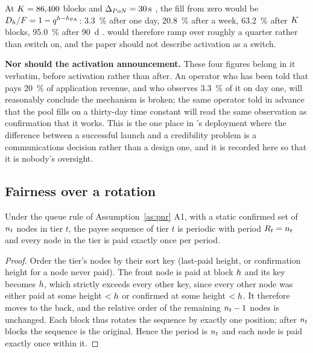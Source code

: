 At $K = 86{,}400$ blocks and $\Delta_{PoN} = \SI{30}{\second}$
, the fill from zero would be
$D_{h}/F = 1 - q^{h - h_{\mathrm{PA}}}$: \SI{3.3}{\percent} after one day, \SI{20.8}{\percent} after a
week, \SI{63.2}{\percent} after $K$ blocks, \SI{95.0}{\percent} after \SI{90}{\day}
. \PNR would therefore ramp over roughly a quarter rather than switch
on, and the paper should not describe activation as a switch.

\textbf{Nor should the activation announcement.} These four figures belong in it verbatim, before
activation rather than after. An operator who has been told that \PNR{} pays \SI{20}{\percent} of
application revenue, and who observes \SI{3.3}{\percent} of it on day one, will reasonably conclude
the mechanism is broken; the same operator told in advance that the pool fills on a thirty-day time
constant will read the same observation as confirmation that it works. This is the one place in
\PNR{}'s deployment where the difference between a successful launch and a credibility problem is a
communications decision rather than a design one, and it is recorded here so that it is nobody's
oversight.


\subsection{Fairness over a rotation}
\label{sec:pnr:fairness}

\begin{proposition}
\label{prop:pnr:rotation}
Under the queue rule of Assumption~\ref{as:pnr} A1, with a static confirmed set of $n_{t}$
nodes in tier $t$, the payee sequence of tier $t$ is periodic with period $R_{t} = n_{t}$ and
every node in the tier is paid exactly once per period.
\end{proposition}

\begin{proof}
Order the tier's nodes by their sort key (last-paid height, or confirmation height for a node never
paid). The front node is paid at block $h$ and its key becomes $h$, which strictly exceeds
every other key, since every other node was either paid at some height $< h$ or confirmed at some
height $< h$. It therefore moves to the back, and the relative order of the remaining
$n_{t} - 1$ nodes is unchanged. Each block thus rotates the sequence by exactly one position;
after $n_{t}$ blocks the sequence is the original. Hence the period is $n_{t}$ and each
node is paid exactly once within it.
\end{proof}

